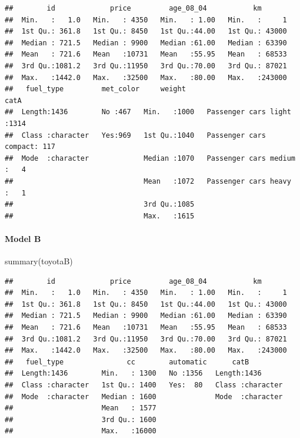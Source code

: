\documentclass[
]{article}
\newenvironment{Shaded}{\begin{snugshade}}{\end{snugshade}}
\newcommand{\FunctionTok}[1]{\textcolor[rgb]{0.00,0.00,0.00}{#1}}
\newcommand{\NormalTok}[1]{#1}
\begin{document}
\begin{verbatim}
##        id             price         age_08_04           km        
##  Min.   :   1.0   Min.   : 4350   Min.   : 1.00   Min.   :     1  
##  1st Qu.: 361.8   1st Qu.: 8450   1st Qu.:44.00   1st Qu.: 43000  
##  Median : 721.5   Median : 9900   Median :61.00   Median : 63390  
##  Mean   : 721.6   Mean   :10731   Mean   :55.95   Mean   : 68533  
##  3rd Qu.:1081.2   3rd Qu.:11950   3rd Qu.:70.00   3rd Qu.: 87021  
##  Max.   :1442.0   Max.   :32500   Max.   :80.00   Max.   :243000  
##   fuel_type         met_color     weight                         catA     
##  Length:1436        No :467   Min.   :1000   Passenger cars light  :1314  
##  Class :character   Yes:969   1st Qu.:1040   Passenger cars compact: 117  
##  Mode  :character             Median :1070   Passenger cars medium :   4  
##                               Mean   :1072   Passenger cars heavy  :   1  
##                               3rd Qu.:1085                                
##                               Max.   :1615
\end{verbatim}

\hypertarget{model-b-4}{%
\paragraph{Model B}\label{model-b-4}}

\begin{Shaded}
\begin{Highlighting}[]
\FunctionTok{summary}\NormalTok{(toyotaB)}
\end{Highlighting}
\end{Shaded}

\begin{verbatim}
##        id             price         age_08_04           km        
##  Min.   :   1.0   Min.   : 4350   Min.   : 1.00   Min.   :     1  
##  1st Qu.: 361.8   1st Qu.: 8450   1st Qu.:44.00   1st Qu.: 43000  
##  Median : 721.5   Median : 9900   Median :61.00   Median : 63390  
##  Mean   : 721.6   Mean   :10731   Mean   :55.95   Mean   : 68533  
##  3rd Qu.:1081.2   3rd Qu.:11950   3rd Qu.:70.00   3rd Qu.: 87021  
##  Max.   :1442.0   Max.   :32500   Max.   :80.00   Max.   :243000  
##   fuel_type               cc        automatic      catB          
##  Length:1436        Min.   : 1300   No :1356   Length:1436       
##  Class :character   1st Qu.: 1400   Yes:  80   Class :character  
##  Mode  :character   Median : 1600              Mode  :character  
##                     Mean   : 1577                                
##                     3rd Qu.: 1600                                
##                     Max.   :16000
\end{verbatim}
\end{document}
